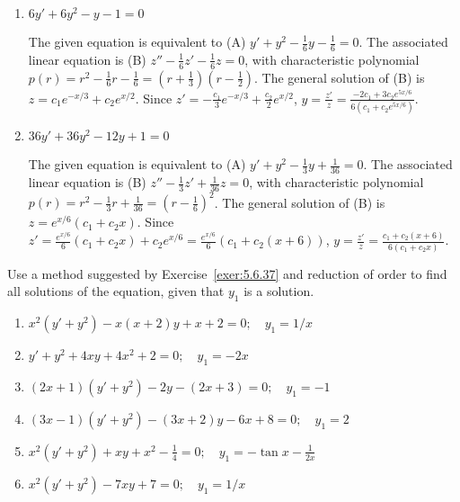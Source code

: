 \documentclass{ximera}
\begin{document}
\begin{problem}
\begin{enumerate}
\item $6y'+6y^2-y-1=0$

\begin{solution}
    The given equation is equivalent to (A)
$y'+y^2-\frac{1}{6}y-\frac{1}{6}=0$. The associated linear
equation is (B) $z''-\frac{1}{6}z'-\frac{1}{6}z=0$, with
characteristic polynomial
$p(r)=r^2-\frac{1}{6}r-\frac{1}{6}=\left(r+\frac{1}{3}\right)
\left(r-\frac{1}{2}\right)$. The general solution of (B) is
$z=c_1e^{-x/3}+c_2e^{x/2}$. Since
$z'=-\frac{c_1}{3}e^{-x/3}+\frac{c_2}{2}e^{x/2}$, $y=\frac{z'}{
z} =\frac{-2c_1+3c_2e^{5x/6}}{ 6(c_1+c_2e^{5x/6})}$.
\end{solution}

\item $36y'+36y^2-12y+1=0$

\begin{solution}
    The given equation is equivalent to (A)
$y'+y^2-\frac{1}{3}y+\frac{1}{36}=0$. The associated linear
equation is (B) $z''-\frac{1}{3}z'+\frac{1}{36}z=0$, with
characteristic polynomial $p(r)=r^2-\frac{1}{3}r+\frac{1}{36}=
\left(r-\frac{1}{6}\right)^2$. The general solution of (B) is
$z=e^{x/6}(c_1+c_2x)$. Since
$z'=\frac{e^{x/6}}{6}(c_1+c_2x)+c_2e^{x/6}=\frac{e^{x/6}}{6}
(c_1+c_2(x+6))$, $y=\frac{z'}{
z}=\frac{c_1+c_2(x+6)}{6(c_1+c_2x)}$.
\end{solution}

\end{enumerate}
\end{problem}

\begin{problem}\label{exer:5.6.39}
Use a method suggested by Exercise~\ref{exer:5.6.37} and reduction of
order to find all solutions of the equation, given that $y_1$ is
a solution.

\begin{enumerate}
\item %
$x^2(y'+y^2)-x(x+2)y+x+2=0;  \quad y_1=1/x$

\item %
$y'+y^2+4xy+4x^2+2=0;   \quad y_1=-2x$

\item %
$(2x+1)(y'+y^2)-2y-(2x+3)=0;   \quad y_1=-1$

\item %
$(3x-1)(y'+y^2)-(3x+2)y-6x+8=0;   \quad y_1=2$

\item %
$x^2(y'+y^2)+xy+x^2-\frac{1}{4}=0;
\quad y_1=-\tan x -\frac{1}{2x}$

\item %
$x^2(y'+y^2)-7xy+7=0;  \quad y_1=1/x$

\end{enumerate}
\end{problem}
\end{document}
